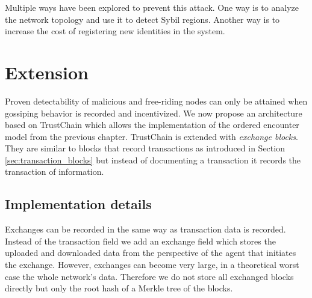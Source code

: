 Multiple ways have been explored to prevent this attack. One way is to analyze the network topology
and use it to detect Sybil regions. Another way is to increase the cost of registering new identities
in the system. 

\section{Extension}
\label{sec:extension}
Proven detectability of malicious and free-riding nodes can only be attained when gossiping behavior
is recorded and incentivized. We now propose an architecture based on TrustChain which allows the 
implementation of the ordered encounter model from the previous chapter. TrustChain is extended with
\textit{exchange blocks}. They are similar to blocks that record transactions as introduced in 
Section \ref{sec:transaction_blocks} but instead of documenting a transaction it records the 
transaction of information.

\subsection{Implementation details}
Exchanges can be recorded in the same way as transaction data is recorded. Instead of the transaction
field we add an exchange field which stores the uploaded and downloaded data from the perspective of
the agent that initiates the exchange. However, exchanges can become very large, in a theoretical 
worst case the whole network's data. Therefore we do not store all exchanged blocks directly but only
the root hash of a Merkle tree of the blocks. 


